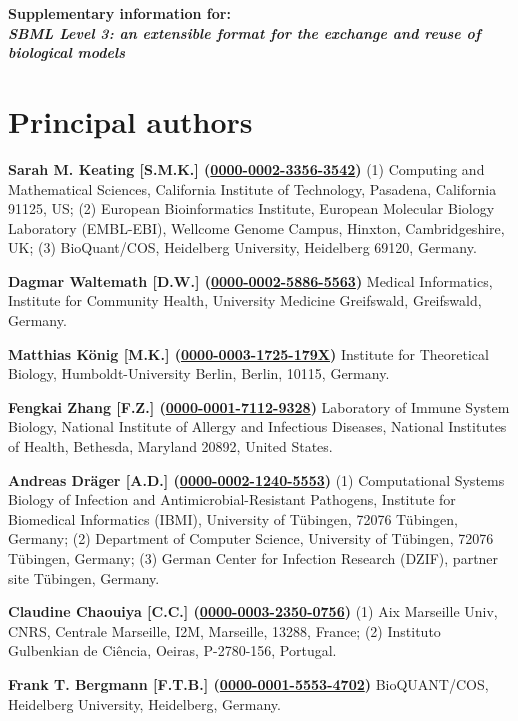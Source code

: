 \documentclass{sbml-paper}
\newcommand{\orcid}[1]{\href{https://orcid.org/#1}{#1}}
\begin{document}
\begin{center}\large\bfseries
Supplementary information for:\\
\emph{SBML Level 3: an extensible format for the exchange and reuse of biological models}
\end{center}

\vspace*{0.25in}

\section{Principal authors}

\textbf{Sarah M. Keating [S.M.K.] (\orcid{0000-0002-3356-3542})} (1) Computing and Mathematical Sciences, California Institute of Technology, Pasadena, California 91125, US; (2) European Bioinformatics Institute, European Molecular Biology Laboratory (EMBL-EBI), Wellcome Genome Campus, Hinxton, Cambridgeshire, UK; (3) BioQuant/COS, Heidelberg University, Heidelberg 69120, Germany.

\textbf{Dagmar Waltemath [D.W.] (\orcid{0000-0002-5886-5563})} Medical Informatics, Institute for Community Health, University Medicine Greifswald, Greifswald, Germany.

\textbf{Matthias K\"{o}nig [M.K.] (\orcid{0000-0003-1725-179X})} Institute for Theoretical Biology, Humboldt-University Berlin, Berlin, 10115, Germany.

\textbf{Fengkai Zhang [F.Z.] (\orcid{0000-0001-7112-9328})} Laboratory of Immune System Biology, National Institute of Allergy and Infectious Diseases, National Institutes of Health, Bethesda, Maryland 20892, United States.

\textbf{Andreas Dr\"{a}ger [A.D.] (\orcid{0000-0002-1240-5553})} (1) Computational Systems Biology of Infection and Antimicrobial-Resistant Pathogens, Institute for Biomedical Informatics (IBMI), University of T\"{u}bingen, 72076 T\"{u}bingen, Germany; (2) Department of Computer Science, University of T\"{u}bingen, 72076 T\"{u}bingen, Germany; (3) German Center for Infection Research (DZIF), partner site T\"{u}bingen, Germany.

\textbf{Claudine Chaouiya [C.C.] (\orcid{0000-0003-2350-0756})} (1) Aix Marseille Univ, CNRS, Centrale Marseille, I2M, Marseille, 13288, France; (2) Instituto Gulbenkian de Ci\^{e}ncia, Oeiras, P-2780-156, Portugal.

\textbf{Frank T. Bergmann [F.T.B.] (\orcid{0000-0001-5553-4702})} BioQUANT/COS, Heidelberg University, Heidelberg, Germany.
\end{document}
